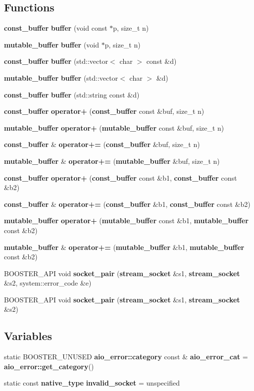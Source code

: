 \subsection*{Functions}
\begin{DoxyCompactItemize}
\item 
{\bf const\+\_\+buffer} {\bf buffer} (void const $\ast$p, size\+\_\+t n)
\item 
{\bf mutable\+\_\+buffer} {\bf buffer} (void $\ast$p, size\+\_\+t n)
\item 
{\bf const\+\_\+buffer} {\bf buffer} (std\+::vector$<$ char $>$ const \&d)
\item 
{\bf mutable\+\_\+buffer} {\bf buffer} (std\+::vector$<$ char $>$ \&d)
\item 
{\bf const\+\_\+buffer} {\bf buffer} (std\+::string const \&d)
\item 
{\bf const\+\_\+buffer} {\bf operator+} ({\bf const\+\_\+buffer} const \&buf, size\+\_\+t n)
\item 
{\bf mutable\+\_\+buffer} {\bf operator+} ({\bf mutable\+\_\+buffer} const \&buf, size\+\_\+t n)
\item 
{\bf const\+\_\+buffer} \& {\bf operator+=} ({\bf const\+\_\+buffer} \&buf, size\+\_\+t n)
\item 
{\bf mutable\+\_\+buffer} \& {\bf operator+=} ({\bf mutable\+\_\+buffer} \&buf, size\+\_\+t n)
\item 
{\bf const\+\_\+buffer} {\bf operator+} ({\bf const\+\_\+buffer} const \&b1, {\bf const\+\_\+buffer} const \&b2)
\item 
{\bf const\+\_\+buffer} \& {\bf operator+=} ({\bf const\+\_\+buffer} \&b1, {\bf const\+\_\+buffer} const \&b2)
\item 
{\bf mutable\+\_\+buffer} {\bf operator+} ({\bf mutable\+\_\+buffer} const \&b1, {\bf mutable\+\_\+buffer} const \&b2)
\item 
{\bf mutable\+\_\+buffer} \& {\bf operator+=} ({\bf mutable\+\_\+buffer} \&b1, {\bf mutable\+\_\+buffer} const \&b2)
\item 
B\+O\+O\+S\+T\+E\+R\+\_\+\+A\+PI void {\bf socket\+\_\+pair} ({\bf stream\+\_\+socket} \&s1, {\bf stream\+\_\+socket} \&s2, system\+::error\+\_\+code \&e)
\item 
B\+O\+O\+S\+T\+E\+R\+\_\+\+A\+PI void {\bf socket\+\_\+pair} ({\bf stream\+\_\+socket} \&s1, {\bf stream\+\_\+socket} \&s2)
\end{DoxyCompactItemize}
\subsection*{Variables}
\begin{DoxyCompactItemize}
\item 
static B\+O\+O\+S\+T\+E\+R\+\_\+\+U\+N\+U\+S\+ED {\bf aio\+\_\+error\+::category} const \& {\bf aio\+\_\+error\+\_\+cat} = {\bf aio\+\_\+error\+::get\+\_\+category}()
\item 
static const {\bf native\+\_\+type} {\bf invalid\+\_\+socket} = unspecified
\end{DoxyCompactItemize}


